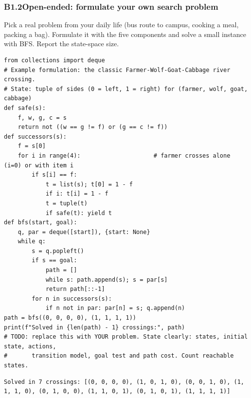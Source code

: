 \documentclass[11pt]{article}
\begin{document}
\subsubsection*{B1.2\quad Open-ended: formulate your own search problem}
Pick a real problem from your daily life (bus route to campus, cooking a meal, packing a bag). Formulate it with the five components and solve a small instance with BFS. Report the state-space size.
\begin{lstlisting}[style=py]
from collections import deque
# Example formulation: the classic Farmer-Wolf-Goat-Cabbage river crossing.
# State: tuple of sides (0 = left, 1 = right) for (farmer, wolf, goat, cabbage)
def safe(s):
    f, w, g, c = s
    return not ((w == g != f) or (g == c != f))
def successors(s):
    f = s[0]
    for i in range(4):                     # farmer crosses alone (i=0) or with item i
        if s[i] == f:
            t = list(s); t[0] = 1 - f
            if i: t[i] = 1 - f
            t = tuple(t)
            if safe(t): yield t
def bfs(start, goal):
    q, par = deque([start]), {start: None}
    while q:
        s = q.popleft()
        if s == goal:
            path = []
            while s: path.append(s); s = par[s]
            return path[::-1]
        for n in successors(s):
            if n not in par: par[n] = s; q.append(n)
path = bfs((0, 0, 0, 0), (1, 1, 1, 1))
print(f"Solved in {len(path) - 1} crossings:", path)
# TODO: replace this with YOUR problem. State clearly: states, initial state, actions,
#       transition model, goal test and path cost. Count reachable states.
\end{lstlisting}
\begin{lstlisting}[style=out]
Solved in 7 crossings: [(0, 0, 0, 0), (1, 0, 1, 0), (0, 0, 1, 0), (1, 1, 1, 0), (0, 1, 0, 0), (1, 1, 0, 1), (0, 1, 0, 1), (1, 1, 1, 1)]
\end{lstlisting}
\end{document}
